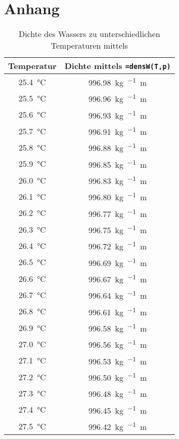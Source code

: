 \section*{Anhang}
\label{sec:anhang}

\vspace*{-2.5mm}
\renewcommand{\arraystretch}{1.2}
\begin{table}[h!]
	\centering
	\caption{Dichte des Wassers zu unterschiedlichen Temperaturen mittels \cite{BernhardSpang.2002}}
	\label{tab:dichte}
	\begin{tabulary}{\textwidth}{C|C}
		\hline
		\textbf{Temperatur} & \textbf{Dichte mittels \texttt{=densW(T,p)}} \\ 
		\hline
		\SI{25,4}{\celsius} & \SI{996,98}{\kg\per{}\meter} \\
		\SI{25,5}{\celsius} & \SI{996,96}{\kg\per{}\meter} \\
		\SI{25,6}{\celsius} & \SI{996,93}{\kg\per{}\meter} \\
		\SI{25,7}{\celsius} & \SI{996,91}{\kg\per{}\meter} \\
		\SI{25,8}{\celsius} & \SI{996,88}{\kg\per{}\meter} \\
		\SI{25,9}{\celsius} & \SI{996,85}{\kg\per{}\meter} \\
		\SI{26,0}{\celsius} & \SI{996,83}{\kg\per{}\meter} \\
		\SI{26,1}{\celsius} & \SI{996,80}{\kg\per{}\meter} \\
		\SI{26,2}{\celsius} & \SI{996,77}{\kg\per{}\meter} \\
		\SI{26,3}{\celsius} & \SI{996,75}{\kg\per{}\meter} \\
		\SI{26,4}{\celsius} & \SI{996,72}{\kg\per{}\meter} \\
		\SI{26,5}{\celsius} & \SI{996,69}{\kg\per{}\meter} \\
		\SI{26,6}{\celsius} & \SI{996,67}{\kg\per{}\meter} \\
		\SI{26,7}{\celsius} & \SI{996,64}{\kg\per{}\meter} \\
		\SI{26,8}{\celsius} & \SI{996,61}{\kg\per{}\meter} \\
		\SI{26,9}{\celsius} & \SI{996,58}{\kg\per{}\meter} \\
		\SI{27,0}{\celsius} & \SI{996,56}{\kg\per{}\meter} \\
		\SI{27,1}{\celsius} & \SI{996,53}{\kg\per{}\meter} \\
		\SI{27,2}{\celsius} & \SI{996,50}{\kg\per{}\meter} \\
		\SI{27,3}{\celsius} & \SI{996,48}{\kg\per{}\meter} \\
		\SI{27,4}{\celsius} & \SI{996,45}{\kg\per{}\meter} \\
		\SI{27,5}{\celsius} & \SI{996,42}{\kg\per{}\meter} \\
		\hline
	\end{tabulary}
\end{table}
\FloatBarrier
\vspace*{-2.5mm}
